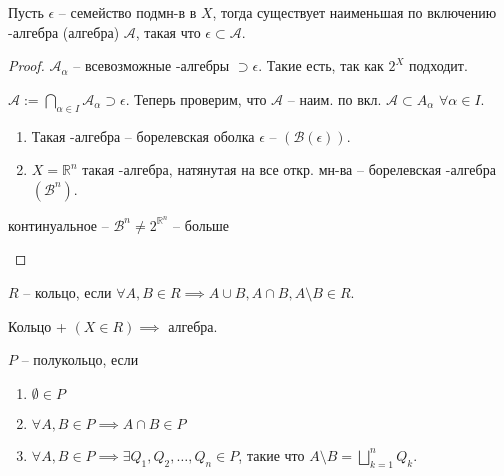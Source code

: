 \begin{theorem}
    Пусть $\epsilon$ -- семейство подмн-в в $X$, тогда существует наименьшая по включению \sigma-алгебра (алгебра) $\mathcal{A}$, такая что $\epsilon \subset \mathcal{A}$.
\end{theorem}

\begin{proof}
    $\mathcal{A}_{\alpha}$ -- всевозможные \sigma-алгебры $\supset \epsilon$. Такие есть, так как $2^X$ подходит.

    $\mathcal{A} := \bigcap_{\alpha \in I} \mathcal{A}_{\alpha} \supset \epsilon$. Теперь проверим, что $\mathcal{A}$ -- наим. по вкл. $\mathcal{A} \subset A_{\alpha}$ $\forall \alpha \in I$.

    \begin{definition}
        \begin{enumerate}
            \item Такая \sigma-алгебра -- борелевская оболка $\epsilon$ -- $(\mathcal{B}(\epsilon))$.
            \item $X = \mathbb{R}^n$ такая \sigma-алгебра, натянутая на все откр. мн-ва -- борелевская \sigma-алгебра $(\mathcal{B}^n)$.
        \end{enumerate}
    \end{definition}

    \begin{remark}
        континуальное -- $\mathcal{B}^n \neq 2^{\mathbb{R}^n}$ -- больше
    \end{remark}
\end{proof}

\begin{definition}
    $R$ -- кольцо, если $\forall A, B \in R \implies A \cup B, A \cap B, A \setminus B \in R$.
\end{definition}

\begin{remark}
    Кольцо + $(X \in R) \implies$ алгебра.
\end{remark}

\begin{definition}
    $P$ -- полукольцо, если 
    \begin{enumerate}
        \item $\emptyset \in P$
        \item $\forall A, B \in P \implies A \cap B \in P$
        \item $\forall A, B \in P \implies \exists Q_1, Q_2, \dots, Q_n \in P$, такие что $A \setminus B = \bigsqcup_{k = 1}^{n}Q_k$.
    \end{enumerate}
\end{definition}

